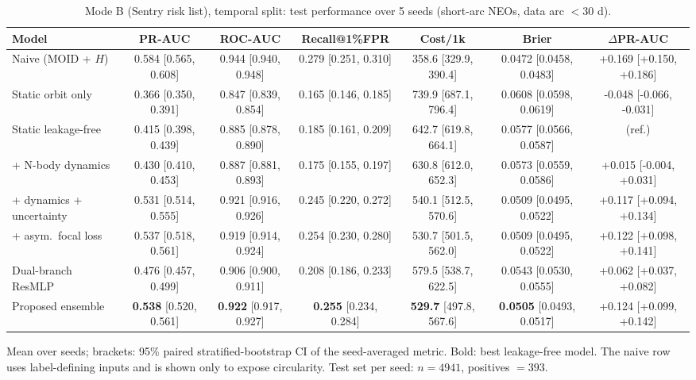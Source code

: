 \begin{table}[t]
\centering
\small
\caption{Mode B (Sentry risk list), temporal split: test performance over 5 seeds (short-arc NEOs, data arc $<30$ d).}
\label{tab:sentry_temporal_short_arc}
\begin{tabular}{lcccccc}
\toprule
Model & PR-AUC & ROC-AUC & Recall@1\%FPR & Cost/1k & Brier & $\Delta$PR-AUC \\
\midrule
Naive (MOID + $H$) & 0.584 \scriptsize{[0.565, 0.608]} & 0.944 \scriptsize{[0.940, 0.948]} & 0.279 \scriptsize{[0.251, 0.310]} & 358.6 \scriptsize{[329.9, 390.4]} & 0.0472 \scriptsize{[0.0458, 0.0483]} & +0.169 \scriptsize{[+0.150, +0.186]} \\
\midrule
Static orbit only & 0.366 \scriptsize{[0.350, 0.391]} & 0.847 \scriptsize{[0.839, 0.854]} & 0.165 \scriptsize{[0.146, 0.185]} & 739.9 \scriptsize{[687.1, 796.4]} & 0.0608 \scriptsize{[0.0598, 0.0619]} & -0.048 \scriptsize{[-0.066, -0.031]} \\
Static leakage-free & 0.415 \scriptsize{[0.398, 0.439]} & 0.885 \scriptsize{[0.878, 0.890]} & 0.185 \scriptsize{[0.161, 0.209]} & 642.7 \scriptsize{[619.8, 664.1]} & 0.0577 \scriptsize{[0.0566, 0.0587]} & (ref.) \\
+ N-body dynamics & 0.430 \scriptsize{[0.410, 0.453]} & 0.887 \scriptsize{[0.881, 0.893]} & 0.175 \scriptsize{[0.155, 0.197]} & 630.8 \scriptsize{[612.0, 652.3]} & 0.0573 \scriptsize{[0.0559, 0.0586]} & +0.015 \scriptsize{[-0.004, +0.031]} \\
+ dynamics + uncertainty & 0.531 \scriptsize{[0.514, 0.555]} & 0.921 \scriptsize{[0.916, 0.926]} & 0.245 \scriptsize{[0.220, 0.272]} & 540.1 \scriptsize{[512.5, 570.6]} & 0.0509 \scriptsize{[0.0495, 0.0522]} & +0.117 \scriptsize{[+0.094, +0.134]} \\
+ asym.\ focal loss & 0.537 \scriptsize{[0.518, 0.561]} & 0.919 \scriptsize{[0.914, 0.924]} & 0.254 \scriptsize{[0.230, 0.280]} & 530.7 \scriptsize{[501.5, 562.0]} & 0.0509 \scriptsize{[0.0495, 0.0522]} & +0.122 \scriptsize{[+0.098, +0.141]} \\
Dual-branch ResMLP & 0.476 \scriptsize{[0.457, 0.499]} & 0.906 \scriptsize{[0.900, 0.911]} & 0.208 \scriptsize{[0.186, 0.233]} & 579.5 \scriptsize{[538.7, 622.5]} & 0.0543 \scriptsize{[0.0530, 0.0555]} & +0.062 \scriptsize{[+0.037, +0.082]} \\
Proposed ensemble & \textbf{0.538} \scriptsize{[0.520, 0.561]} & \textbf{0.922} \scriptsize{[0.917, 0.927]} & \textbf{0.255} \scriptsize{[0.234, 0.284]} & \textbf{529.7} \scriptsize{[497.8, 567.6]} & \textbf{0.0505} \scriptsize{[0.0493, 0.0517]} & +0.124 \scriptsize{[+0.099, +0.142]} \\
\bottomrule
\end{tabular}
\par\vspace{2pt}\footnotesize Mean over seeds; brackets: 95\% paired stratified-bootstrap CI of the seed-averaged metric. Bold: best leakage-free model. The naive row uses label-defining inputs and is shown only to expose circularity. Test set per seed: $n=4941$, positives $=393$.
\end{table}
